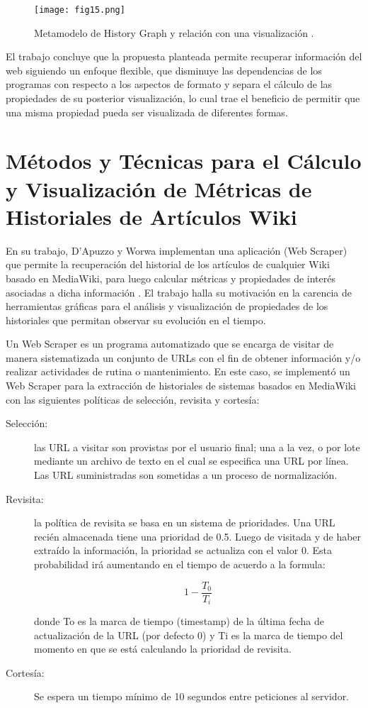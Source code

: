 \begin{figure}[htp]
  \centering
  \texttt{[image: fig15.png]}
  \caption[Metamodelo de History Graph y relación con una visualización]{Metamodelo de History Graph y relación con una visualización \cite[Fig. 6]{Sca08}.}
  \label{fig:fig15}
\end{figure}

El trabajo concluye que la propuesta planteada permite recuperar información del web siguiendo un enfoque flexible, que disminuye las dependencias de los programas con respecto a los aspectos de formato y separa el cálculo de las propiedades de su posterior visualización, lo cual trae el beneficio de permitir que una misma propiedad pueda ser visualizada de diferentes formas.

\section{Métodos y Técnicas para el Cálculo y Visualización de Métricas de Historiales de Artículos Wiki}
En su trabajo, D’Apuzzo y Worwa implementan una aplicación (Web Scraper) que permite la recuperación del historial de los artículos de cualquier Wiki basado en MediaWiki, para luego calcular métricas y propiedades de interés asociadas a dicha información \cite{Dap12}. El trabajo halla su motivación en la carencia de herramientas gráficas para el análisis y visualización de propiedades de los historiales que permitan observar su evolución en el tiempo.

Un Web Scraper es un programa automatizado que se encarga de visitar de manera sistematizada un conjunto de URLs con el fin de obtener información y/o realizar actividades de rutina o mantenimiento. En este caso, se implementó un Web Scraper para la extracción de historiales de sistemas basados en MediaWiki con las siguientes políticas de selección, revisita y cortesía:

\begin{description}
  \item[Selección:] las URL a visitar son provistas por el usuario final; una a la vez, o por lote mediante un archivo de texto en el cual se especifica una URL por línea. Las URL suministradas son sometidas a un proceso de normalización.
  \item[Revisita:] la política de revisita se basa en un sistema de prioridades. Una URL recién almacenada tiene una prioridad de 0.5. Luego de visitada y de haber extraído la información, la prioridad se actualiza con el valor 0. Esta probabilidad irá aumentando en el tiempo de acuerdo a la formula:

\begin{equation}
  1-\frac{T_{0}}{T_{i}}
\end{equation}

donde To es la marca de tiempo (timestamp) de la última fecha de actualización de la URL (por defecto 0) y Ti es la marca de tiempo del momento en que se está calculando la prioridad de revisita.
  \item[Cortesía:] Se espera un tiempo mínimo de 10 segundos entre peticiones al servidor.
\end{description}

